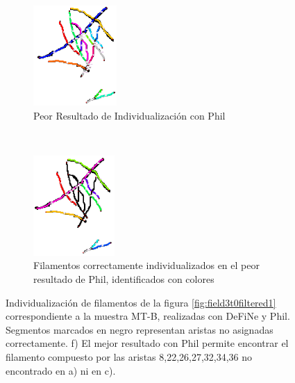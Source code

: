 \begin{figure}[h!]
    \begin{subfigure}[t]{0.49\textwidth}
        \centering
        \includegraphics[height=1.5in]{resultImages/field3-t0-2cellBcrop-filtered-phil-s10-v05-antLabeled.png}
        \caption{Peor Resultado de Individualizaci\'on con Phil}
        \label{field3t0filtered1Results-worstPhil}
    \end{subfigure}
    ~ 
    \begin{subfigure}[t]{0.49\textwidth}
        \centering
        \includegraphics[height=1.5in]{resultImages/field3-t0-2cellBcrop-filtered-phil-s10-v05-exactMatch-antLabeled.png}
        \caption{Filamentos correctamente individualizados en el peor resultado de Phil, identificados con colores}
        \label{field3t0filtered1Results-worstPhilExact}
    \end{subfigure}
    
    \caption{Individualizaci\'on  de filamentos de la figura \ref{fig:field3t0filtered1} correspondiente a la muestra MT-B, realizadas con DeFiNe y Phil. Segmentos marcados en negro representan aristas no asignadas correctamente. f) El mejor resultado con Phil permite encontrar el filamento compuesto por las aristas 8,22,26,27,32,34,36 no encontrado en a) ni en c). }
    \label{fig:field3t0filtered1Results}
\end{figure}
\clearpage
\newpage


